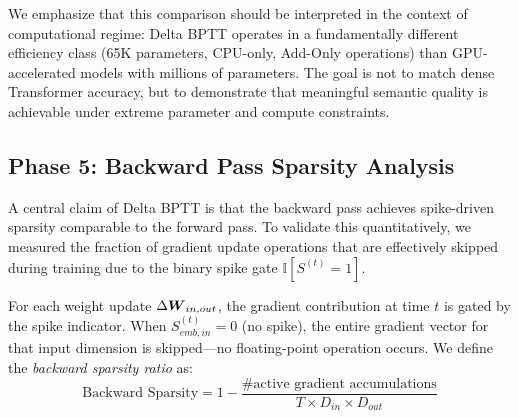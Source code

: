 \documentclass[10pt,a4paper,twoside]{article}
\begin{document}
We emphasize that this comparison should be interpreted in the context of computational regime: Delta BPTT operates in a fundamentally different efficiency class (65K parameters, CPU-only, Add-Only operations) than GPU-accelerated models with millions of parameters. The goal is not to match dense Transformer accuracy, but to demonstrate that meaningful semantic quality is achievable under extreme parameter and compute constraints.

\subsection{Phase 5: Backward Pass Sparsity Analysis}
A central claim of Delta BPTT is that the backward pass achieves spike-driven sparsity comparable to the forward pass. To validate this quantitatively, we measured the fraction of gradient update operations that are effectively skipped during training due to the binary spike gate $\mathbb{I}[S^{(t)} = 1]$.

For each weight update $\Delta \boldsymbol{W}_{in, out}$, the gradient contribution at time $t$ is gated by the spike indicator. When $S_{emb,in}^{(t)} = 0$ (no spike), the entire gradient vector for that input dimension is skipped---no floating-point operation occurs. We define the \textit{backward sparsity ratio} as:
\begin{equation}
\text{Backward Sparsity} = 1 - \frac{\text{\# active gradient accumulations}}{T \times D_{in} \times D_{out}}
\end{equation}

\begin{table}[t!]
\begin{center}
{\caption{Forward and backward pass sparsity ratios measured during training at $D_{model} = 256$. Backward sparsity is computed over the weight gradient accumulation of the Delta BPTT Pooler layer.}\label{tab:sparsity}}


\end{center}
\end{table}
\end{document}
